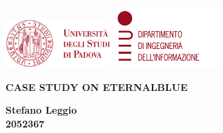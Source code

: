 \begin{titlepage}
  \begin{center}
    \includegraphics[width=0.3\textwidth]{images/unipd.png}
    \hfill
    \includegraphics[width=0.3\textwidth]{images/dei.png}
  \end{center}
  \begin{center}
    \vspace{10cm}
    \MakeUppercase{
      \textbf{
        Case study on EternalBlue\\
      }
    }
    \vspace{9cm}
    \begin{flushright}
      \textbf{
        Stefano Leggio\\
        2052367\\
      }
    \end{flushright}
  \end{center}
\end{titlepage}